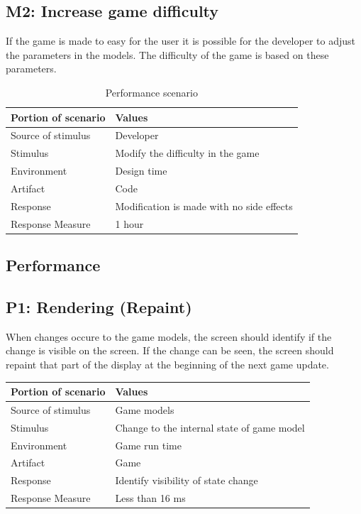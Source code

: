\subsection* {M2: Increase game difficulty}
If the game is made to easy for the user it is possible for the developer to adjust the
parameters in the models. The difficulty of the game is based on these parameters.

\begin{table}[H]
\begin{tabular}{| l | l |}
	\hline
	\rowcolor{gray}
	{\bf Portion of scenario} & {\bf Values} \\ \hline
	Source of stimulus & Developer\\ \hline
	Stimulus & Modify the difficulty in the game\\ \hline
	Environment & Design time \\ \hline
	Artifact & Code \\ \hline
	Response & Modification is made with no side effects\\ \hline
	Response Measure & 1 hour\\ \hline
\end{tabular}
\caption{Performance scenario}
\end{table}

\subsection{Performance}
\cite{attributes}

\subsection*{P1: Rendering (Repaint)}
When changes occure to the game models, the screen should identify if the change 
is visible on the screen. If the change can be seen, the screen should repaint 
that part of the display at the beginning of the next game update.

\begin{tabular}{| l | l |}
	\hline
	\rowcolor{gray}
	{\bf Portion of scenario} & {\bf Values} \\ \hline
	Source of stimulus & Game models\\ \hline
	Stimulus & Change to the internal state of game model\\ \hline
	Environment & Game run time \\ \hline
	Artifact &  Game \\ \hline
	Response & Identify visibility of state change\\ \hline
	Response Measure & Less than 16 ms\\ \hline
\end{tabular}


